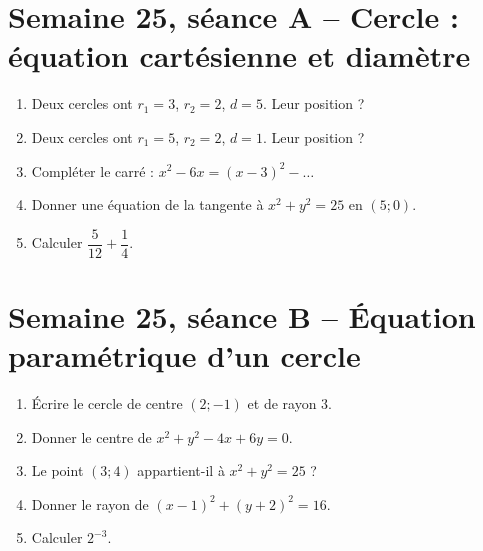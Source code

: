 \section{Semaine 25, séance A -- Cercle : équation cartésienne et diamètre}
\begin{enumerate}
  \item Deux cercles ont $r_1=3$, $r_2=2$, $d=5$. Leur position ?
  \item Deux cercles ont $r_1=5$, $r_2=2$, $d=1$. Leur position ?
  \item Compléter le carré : $x^2-6x=(x-3)^2-\ldots$
  \item Donner une équation de la tangente à $x^2+y^2=25$ en $(5;0)$.
  \item Calculer $\dfrac{5}{12}+\dfrac14$.
\end{enumerate}

\section{Semaine 25, séance B -- Équation paramétrique d'un cercle}
\begin{enumerate}
  \item Écrire le cercle de centre $(2;-1)$ et de rayon $3$.
  \item Donner le centre de $x^2+y^2-4x+6y=0$.
  \item Le point $(3;4)$ appartient-il à $x^2+y^2=25$ ?
  \item Donner le rayon de $(x-1)^2+(y+2)^2=16$.
  \item Calculer $2^{-3}$.
\end{enumerate}

